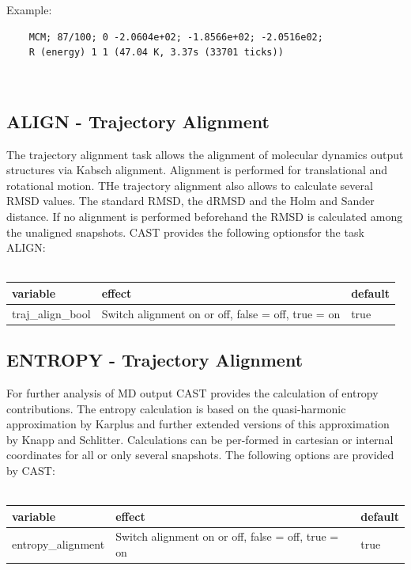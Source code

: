 \documentclass[10pt,a4paper]{article} %
\newif\ifdevmode %
\begin{document}
	Example:\\
	\begin{lstlisting}
	MCM; 87/100; 0 -2.0604e+02; -1.8566e+02; -2.0516e02;
	R (energy) 1 1 (47.04 K, 3.37s (33701 ticks))
	\end{lstlisting}~\\

	\subsection{ALIGN - Trajectory Alignment}
	 The trajectory alignment task allows the alignment of molecular dynamics output structures via Kabsch alignment. Alignment is performed for translational and rotational motion. THe trajectory alignment also allows to calculate several RMSD values. The standard RMSD, the dRMSD and the Holm and Sander distance. If no alignment is performed beforehand the RMSD is calculated among the unaligned snapshots. CAST provides the following optionsfor the task ALIGN: \\~\\

	\begin{tabularx}{\textwidth}{l|X|X}
		variable & effect & default\\
		\hline
		traj_align_bool & Switch alignment on or off, false = off, true = on & true\\

	\end{tabularx}
	\ifdevmode
	\colorbox{red}{HERE IS STILL WORK TO BE DONE}
	\fi

	\subsection{ENTROPY - Trajectory Alignment}
	For further analysis of MD output CAST provides the calculation of entropy contributions. The entropy calculation is based on the quasi-harmonic approximation by Karplus and further extended versions of this approximation by Knapp and Schlitter. Calculations can be per-formed in cartesian or internal coordinates for all or only several snapshots. The following options are provided by CAST: \\~\\

	\begin{tabularx}{\textwidth}{l|X|X}
		variable & effect & default\\
		\hline
		entropy_alignment & Switch alignment on or off, false = off, true = on & true\\

	\end{tabularx}
	\ifdevmode
	\colorbox{red}{HERE IS STILL WORK TO BE DONE}
	\fi
\end{document}
